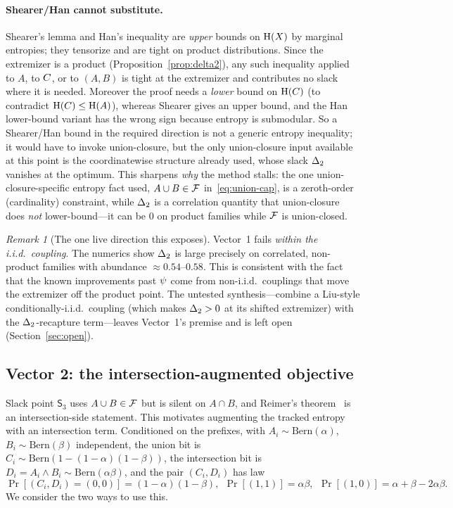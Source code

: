 \documentclass[11pt]{amsart}
\theoremstyle{definition}
\theoremstyle{remark}
\newtheorem{remark}[theorem]{Remark}
\begin{document}
\paragraph{Shearer/Han cannot substitute.}
Shearer's lemma and Han's inequality are \emph{upper} bounds on $\operatorname{H}(X)$ by
marginal entropies; they tensorize and are tight on product distributions. Since
the extremizer is a product (Proposition~\ref{prop:delta2}), any such inequality
applied to $A$, to $C$, or to $(A,B)$ is tight at the extremizer and
contributes no slack where it is needed. Moreover the proof needs a \emph{lower}
bound on $\operatorname{H}(C)$ (to contradict $\operatorname{H}(C)\le\operatorname{H}(A)$), whereas Shearer gives
an upper bound, and the Han lower-bound variant has the wrong sign because entropy
is submodular. So a Shearer/Han bound in the required direction is not a generic
entropy inequality; it would have to invoke union-closure, but the only
union-closure input available at this point is the coordinatewise
structure already used, whose slack $\Delta_2$ vanishes at the optimum. This
sharpens \emph{why} the method stalls: the one union-closure-specific entropy fact
used, $A\cup B\in\mathcal{F}$ in~\eqref{eq:union-cap}, is a zeroth-order (cardinality)
constraint, while $\Delta_2$ is a correlation quantity that union-closure does
\emph{not} lower-bound---it can be $0$ on product families while $\mathcal{F}$ is
union-closed.

\begin{remark}[The one live direction this exposes]\label{rmk:v1-live}
Vector~1 fails \emph{within the i.i.d.\ coupling}. The numerics show $\Delta_2$ is
large precisely on correlated, non-product families with abundance
$\approx 0.54$--$0.58$. This is consistent with the fact that the known
improvements past $\psi$ come from non-i.i.d.\ couplings that move the extremizer
off the product point. The untested synthesis---combine a Liu-style
conditionally-i.i.d.\ coupling (which makes $\Delta_2>0$ at its shifted extremizer)
with the $\Delta_2$-recapture term---leaves Vector~1's premise and is left open
(Section~\ref{sec:open}).
\end{remark}

\subsection{Vector 2: the intersection-augmented objective}
\label{ssec:vector2}

Slack point $\mathsf S_3$ uses $A\cup B\in\mathcal{F}$ but is silent on $A\cap B$, and
Reimer's theorem~\cite{reimer2003} is an intersection-side statement. This
motivates augmenting the tracked entropy with an intersection term. Conditioned on
the prefixes, with $A_i\sim\mathrm{Bern}(\alpha)$, $B_i\sim\mathrm{Bern}(\beta)$
independent, the union bit is $C_i\sim\mathrm{Bern}(1-(1-\alpha)(1-\beta))$, the
intersection bit is $D_i=A_i\wedge B_i\sim\mathrm{Bern}(\alpha\beta)$, and the
pair $(C_i,D_i)$ has law
\begin{equation}\label{eq:pairlaw}
   \Pr[(C_i,D_i)=(0,0)]=(1-\alpha)(1-\beta),\ \
   \Pr[(1,1)]=\alpha\beta,\ \
   \Pr[(1,0)]=\alpha+\beta-2\alpha\beta .
\end{equation}
We consider the two ways to use this.
\end{document}
